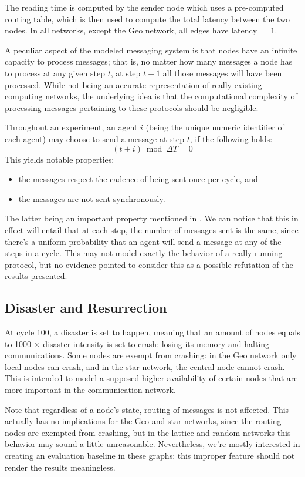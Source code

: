 \documentclass[a4paper]{ifacconf}
\newcommand{\DT}{\ensuremath{{\Delta}T}}
\begin{document}
The reading time is computed by the sender node which uses a pre-computed routing table, which is then used to compute the total latency between the two nodes.
In all networks, except the Geo network, all edges have latency $= 1$.

A peculiar aspect of the modeled messaging system is that nodes have an infinite capacity to process messages; that is, no matter how many messages a node has to process at any given step $t$, at step $t + 1$ all those messages will have been processed.
While not being an accurate representation of really existing computing networks, the underlying idea is that the computational complexity of processing messages pertaining to these protocols should be negligible.

Throughout an experiment, an agent $i$ (being the unique numeric identifier of each agent) may choose to send a message at step $t$, if the following holds:
$$
(t + i) \bmod \DT = 0
$$
This yields notable properties:
\begin{itemize}
    \item the messages respect the cadence of being sent once per cycle, and
    \item the messages are not sent synchronously.
\end{itemize}

The latter being an important property mentioned in \cite[\S2.2]{cyclon}.
We can notice that this in effect will entail that at each step, the number of messages sent is the same, since there's a uniform probability that an agent will send a message at any of the steps in a cycle.
This may not model exactly the behavior of a really running protocol, but no evidence pointed to consider this as a possible refutation of the results presented.

\subsection{Disaster and Resurrection}

At cycle 100, a disaster is set to happen, meaning that an amount of nodes equals to 1000 $\times$ disaster intensity is set to crash: losing its memory and halting communications.
Some nodes are exempt from crashing: in the Geo network only local nodes can crash, and in the star network, the central node cannot crash.
This is intended to model a supposed higher availability of certain nodes that are more important in the communication network.

Note that regardless of a node's state, routing of messages is not affected.
This actually has no implications for the Geo and star networks, since the routing nodes are exempted from crashing, but in the lattice and random networks this behavior may sound a little unreasonable.
Nevertheless, we're mostly interested in creating an evaluation baseline in these graphs: this improper feature should not render the results meaningless.
\end{document}
